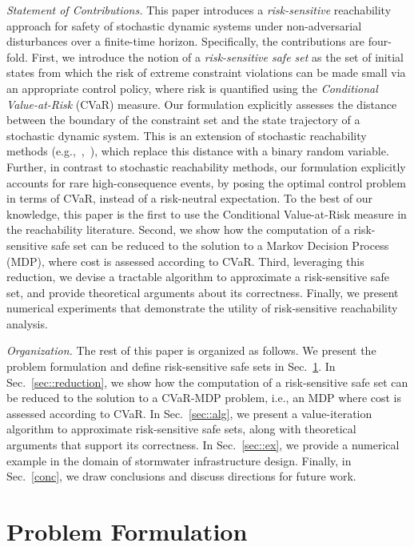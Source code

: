 \documentclass[letterpaper, 10 pt, conference]{ieeeconf}  %
\begin{document}
{\em Statement of Contributions.} This paper introduces a {\em risk-sensitive} reachability approach for safety of stochastic dynamic systems under non-adversarial disturbances
over a finite-time horizon. Specifically, the contributions are four-fold. 
First, we introduce the notion of a \textit{risk-sensitive safe set} as the set of initial states 
from which the risk of extreme constraint violations can be made small via an appropriate control policy, 
where risk is quantified using the \textit{Conditional Value-at-Risk} (CVaR) measure. 
Our formulation explicitly assesses the distance between the boundary of the constraint set and the
state trajectory of a stochastic dynamic system. This is an extension of stochastic 
reachability methods (e.g.,~\cite{abate2008probabilistic},~\cite{summers2010verification}), which replace this distance with a binary random variable.
Further, in contrast to stochastic reachability methods, our formulation explicitly accounts for rare high-consequence events, by posing the optimal control problem
in terms of CVaR, instead of a risk-neutral expectation. 
To the best of our knowledge, this paper is the first to use the Conditional Value-at-Risk measure in the reachability literature.
Second, we show how the computation of a risk-sensitive safe set can be reduced to the solution to a Markov Decision Process (MDP), 
where cost is assessed according to CVaR. Third, leveraging this reduction, we devise a tractable algorithm to approximate a risk-sensitive safe set, 
and provide theoretical arguments about its correctness. 
Finally, we present numerical experiments that demonstrate the utility of risk-sensitive reachability analysis.

{\em Organization.} The rest of this paper is organized as follows. We present the problem formulation and define risk-sensitive safe sets in Sec.~\ref{sec::problem}. 
In Sec.~\ref{sec::reduction}, we show how the computation of a risk-sensitive safe set can be reduced to the solution to a CVaR-MDP problem, 
i.e., an MDP where cost is assessed according to CVaR. 
In Sec.~\ref{sec::alg}, we present a value-iteration algorithm to approximate risk-sensitive safe sets, along with theoretical arguments that support its correctness. 
In Sec.~\ref{sec::ex}, we provide a numerical example in the domain of stormwater infrastructure design. 
Finally, in Sec.~\ref{conc}, we draw conclusions and discuss directions for future work.
%
\section{Problem Formulation}\label{sec::problem}
%
\end{document}
